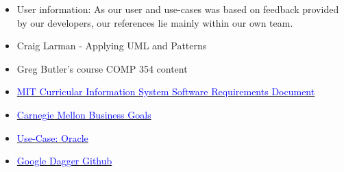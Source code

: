 \documentclass[12pt]{article}
\begin{document}
\begin{itemize}
\item User information: As our user and use-cases was based on feedback provided by our developers, our references lie mainly within our own team.
\item Craig Larman - Applying UML and Patterns
\item Greg Butler's course COMP 354 content
\item \href{http://web.mit.edu/ssit/cis/CISRequirements.html}{\textcolor{blue}{MIT Curricular Information System
Software Requirements Document}}
\item \href{https://resources.sei.cmu.edu/asset_files/TechnicalReport/2005_005_001_14621.pdf}{\textcolor{blue}{Carnegie Mellon Business Goals}}
\item \href{http://www.oracle.com/technetwork/testcontent/gettingstartedwithusecasemodeling-133857.pdf}{\textcolor{blue}{Use-Case: Oracle }}
\item \href{https://github.com/google/dagger}{\textcolor{blue}{Google Dagger Github}}

\end{itemize}
\end{document}
